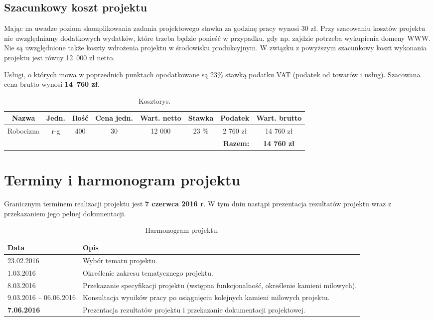 \documentclass[a4paper, 11pt]{article}
\begin{document}
	\subsection*{Szacunkowy koszt projektu}
	Mając na uwadze poziom skomplikowania zadania projektowego stawka za godzinę pracy wynosi 30 zł. Przy szacowaniu kosztów projektu nie uwzględniamy dodatkowych wydatków, które trzeba będzie ponieść w przypadku, gdy np. zajdzie potrzeba wykupienia domeny WWW. Nie są uwzględnione także koszty wdrożenia projektu w środowisku produkcyjnym. W związku z powyższym szacunkowy koszt wykonania projektu jest równy 12 000 zł netto. 
	
	Usługi, o których mowa w poprzednich punktach opodatkowane są 23\% stawką podatku VAT (podatek od towarów i usług). Szacowana cena brutto wynosi \textbf{14 760 zł}.
	
	\begin{table}[H]
		\centering
		\caption{Kosztorys.}
		\smallskip
		\begin{tabular}{|c|c|c|c|c|c|c|c|}
			\hline
			\textbf{Nazwa} & \textbf{Jedn.} & \textbf{Ilość} & \textbf{Cena jedn.} & \textbf{Wart. netto} & \textbf{Stawka} & \textbf{Podatek} & \textbf{Wart. brutto} \\\hline
			Robocizna & r-g & 400 & 30 & 12 000 & 23 \% & 2 760 zł & 14 760 zł \\\hline
			\multicolumn{7}{r|}{\bf Razem:} & \textbf{14 760 zł} \\\cline{8-8}
		\end{tabular}
	\end{table}
		
	\section{Terminy i harmonogram projektu}
	Granicznym terminem realizacji projektu jest \textbf{7 czerwca 2016 r}. W tym dniu nastąpi prezentacja rezultatów projektu wraz z przekazaniem jego pełnej dokumentacji.
	
	\begin{table}[H]
		\centering
		\caption{Harmonogram projektu.}
		\smallskip
		\begin{tabular}{p{4cm}p{8cm}}
			\textbf{Data}& \textbf{Opis} \\\hline
			23.02.2016 & Wybór tematu projektu. \\\hline
			1.03.2016 & Określenie zakresu tematycznego projektu. \\\hline
			8.03.2016 & Przekazanie specyfikacji projektu (wstępna funkcjonalność, określenie kamieni milowych). \\\hline
			9.03.2016 -- 06.06.2016 & Konsultacja wyników pracy po osiągnięciu kolejnych kamieni milowych projektu. \\\hline
			\textbf{7.06.2016} & Prezentacja rezultatów projektu i przekazanie dokumentacji projektowej. \\\hline
		\end{tabular}
	\end{table}
	
\end{document}
